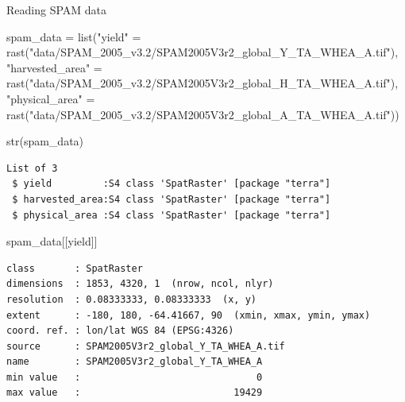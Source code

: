 \documentclass[
  ignorenonframetext,
  aspectratio=169,
]{beamer}
\newenvironment{Shaded}{\begin{snugshade}}{\end{snugshade}}
\newcommand{\FunctionTok}[1]{\textcolor[rgb]{0.28,0.35,0.67}{#1}}
\newcommand{\NormalTok}[1]{\textcolor[rgb]{0.00,0.23,0.31}{#1}}
\newcommand{\OtherTok}[1]{\textcolor[rgb]{0.00,0.23,0.31}{#1}}
\newcommand{\StringTok}[1]{\textcolor[rgb]{0.13,0.47,0.30}{#1}}
\begin{document}
\begin{frame}[fragile]{Reading SPAM data}
\protect\hypertarget{reading-spam-data}{}
\linespread{0.5}

\begin{Shaded}
\begin{Highlighting}[]
\NormalTok{spam\_data }\OtherTok{=} \FunctionTok{list}\NormalTok{(}\StringTok{"yield"} \OtherTok{=} \FunctionTok{rast}\NormalTok{(}\StringTok{"data/SPAM\_2005\_v3.2/SPAM2005V3r2\_global\_Y\_TA\_WHEA\_A.tif"}\NormalTok{),}
                 \StringTok{"harvested\_area"} \OtherTok{=} \FunctionTok{rast}\NormalTok{(}\StringTok{"data/SPAM\_2005\_v3.2/SPAM2005V3r2\_global\_H\_TA\_WHEA\_A.tif"}\NormalTok{),}
                 \StringTok{"physical\_area"} \OtherTok{=} \FunctionTok{rast}\NormalTok{(}\StringTok{"data/SPAM\_2005\_v3.2/SPAM2005V3r2\_global\_A\_TA\_WHEA\_A.tif"}\NormalTok{))}
\end{Highlighting}
\end{Shaded}

\linespread{2}

\linespread{0.5}

\begin{Shaded}
\begin{Highlighting}[]
\FunctionTok{str}\NormalTok{(spam\_data)   }
\end{Highlighting}
\end{Shaded}

\begin{verbatim}
List of 3
 $ yield         :S4 class 'SpatRaster' [package "terra"]
 $ harvested_area:S4 class 'SpatRaster' [package "terra"]
 $ physical_area :S4 class 'SpatRaster' [package "terra"]
\end{verbatim}

\begin{Shaded}
\begin{Highlighting}[]
\NormalTok{spam\_data[[}\StringTok{\textquotesingle{}yield\textquotesingle{}}\NormalTok{]]}
\end{Highlighting}
\end{Shaded}

\begin{verbatim}
class       : SpatRaster 
dimensions  : 1853, 4320, 1  (nrow, ncol, nlyr)
resolution  : 0.08333333, 0.08333333  (x, y)
extent      : -180, 180, -64.41667, 90  (xmin, xmax, ymin, ymax)
coord. ref. : lon/lat WGS 84 (EPSG:4326) 
source      : SPAM2005V3r2_global_Y_TA_WHEA_A.tif 
name        : SPAM2005V3r2_global_Y_TA_WHEA_A 
min value   :                               0 
max value   :                           19429 
\end{verbatim}

\linespread{2}
\end{frame}
\end{document}
